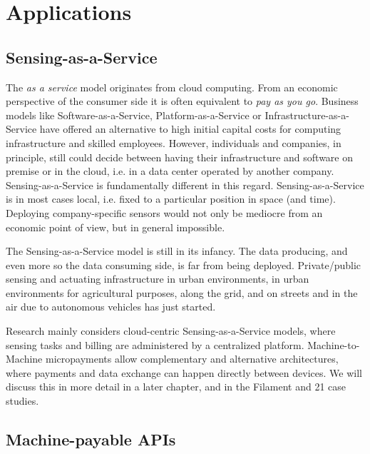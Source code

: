 \section{Applications}

\subsection{Sensing-as-a-Service}
\label{sec:micro:apps:s2aas}

The \emph{as a service} model originates from cloud computing. From an economic perspective of the consumer side it is often equivalent to \emph{pay as you go}. Business models like Software-as-a-Service, Platform-as-a-Service or Infrastructure-as-a-Service have offered an alternative to high initial capital costs for computing infrastructure and skilled employees. However, individuals and companies, in principle, still could decide between having their infrastructure and software on premise or in the cloud, i.e. in a data center operated by another company. Sensing-as-a-Service is fundamentally different in this regard. Sensing-as-a-Service is in most cases local, i.e. fixed to a particular position in space (and time). Deploying company-specific sensors would not only be mediocre from an economic point of view, but in general impossible. 

The Sensing-as-a-Service model is still in its infancy. The data producing, and even more so the data consuming side, is far from being deployed. Private/public sensing and actuating infrastructure in urban environments, in urban environments for agricultural purposes, along the grid, and on streets and in the air due to autonomous vehicles has just started.

Research mainly considers cloud-centric Sensing-as-a-Service models, where sensing tasks and billing are administered by a centralized platform. Machine-to-Machine micropayments allow complementary and alternative architectures, where payments and data exchange can happen directly between devices. We will discuss this in more detail in a later chapter, and in the Filament and 21 case studies.




\subsection{Machine-payable APIs}


